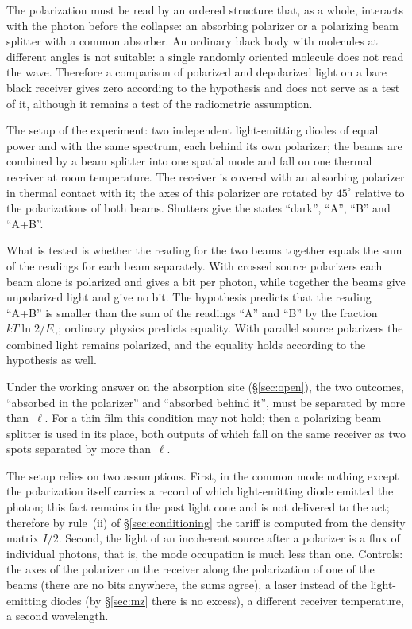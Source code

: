 \documentclass[11pt,a4paper]{article}
\newcommand{\Sref}[1]{\hyperref[#1]{\S\ref{#1}}}
\begin{document}
The polarization must be read by an ordered structure that, as a whole, interacts with the photon before the collapse: an absorbing polarizer or a polarizing beam splitter with a common absorber. An ordinary black body with molecules at different angles is not suitable: a single randomly oriented molecule does not read the wave. Therefore a comparison of polarized and depolarized light on a bare black receiver gives zero according to the hypothesis and does not serve as a test of it, although it remains a test of the radiometric assumption.

The setup of the experiment: two independent light-emitting diodes of equal power and with the same spectrum, each behind its own polarizer; the beams are combined by a beam splitter into one spatial mode and fall on one thermal receiver at room temperature. The receiver is covered with an absorbing polarizer in thermal contact with it; the axes of this polarizer are rotated by $45^\circ$ relative to the polarizations of both beams. Shutters give the states ``dark'', ``A'', ``B'' and ``A+B''.

What is tested is whether the reading for the two beams together equals the sum of the readings for each beam separately. With crossed source polarizers each beam alone is polarized and gives a bit per photon, while together the beams give unpolarized light and give no bit. The hypothesis predicts that the reading ``A+B'' is smaller than the sum of the readings ``A'' and ``B'' by the fraction $kT\ln 2/E_\gamma$; ordinary physics predicts equality. With parallel source polarizers the combined light remains polarized, and the equality holds according to the hypothesis as well.

Under the working answer on the absorption site (\Sref{sec:open}), the two outcomes, ``absorbed in the polarizer'' and ``absorbed behind it'', must be separated by more than~$\ell$. For a thin film this condition may not hold; then a polarizing beam splitter is used in its place, both outputs of which fall on the same receiver as two spots separated by more than~$\ell$.

The setup relies on two assumptions. First, in the common mode nothing except the polarization itself carries a record of which light-emitting diode emitted the photon; this fact remains in the past light cone and is not delivered to the act; therefore by rule~(ii) of \Sref{sec:conditioning} the tariff is computed from the density matrix $I/2$. Second, the light of an incoherent source after a polarizer is a flux of individual photons, that is, the mode occupation is much less than one. Controls: the axes of the polarizer on the receiver along the polarization of one of the beams (there are no bits anywhere, the sums agree), a laser instead of the light-emitting diodes (by \Sref{sec:mz} there is no excess), a different receiver temperature, a second wavelength.
\end{document}
